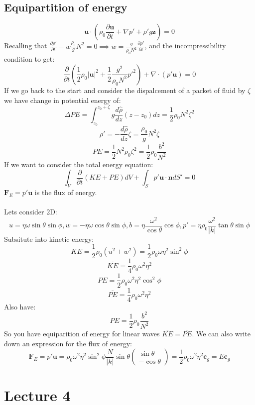 \documentclass{article}
\begin{document}
\subsection{Equipartition of energy}
$$
\bm u \cdot (\rho_0 \frac{\partial \bm u}{\partial t} + \nabla p' + \rho' g \bm z) = 0
$$
Recalling that $\frac{\partial \rho'}{\partial t} - w \frac{\rho_0}{g} N^2 = 0 \implies w = \frac{g}{\rho_0 N^2} \frac{\partial \rho'}{\partial t}$, and the incompressibility condition to get:
$$
\frac{\partial}{\partial t}( \frac{1}{2} \rho_0 |\bm u |^2 + \frac{1}{2} \frac{g^2}{\rho_0 N^2} p'^2 ) + \nabla \cdot (p' \bm u) = 0
$$
If we go back to the start and consider the dispalcement of a packet of fluid by $\zeta$ we have change in potential energy of:
$$
\Delta PE = \int^{z_0 + \zeta}_{z_0} g \frac{d \hat \rho}{d z} (z - z_0) dz = \frac{1}{2} \rho_0 N^2 \zeta^2
$$
$$
\rho' = - \frac{d \hat \rho}{dz} \zeta = \frac{\rho_0}{g} N^2 \zeta 
$$
$$
PE = \frac{1}{2} N^2 \rho_0 \zeta^2 = \frac{1}{2} \rho_0 \frac{b^2}{N^2}
$$
If we want to consider the total energy equation:
$$
\int_V \frac{\partial}{\partial t} (KE + PE) dV + \int_S p' \bm u \cdot \bm n dS' = 0
$$
$\bm F_E = p'\bm u$ is the flux of energy.\\\\
Lets consider 2D:
$$
u = \eta \omega \sin \theta \sin \phi, w = - \eta \omega \cos \theta \sin \phi, b = \eta \frac{\omega^2}{\cos \theta} \cos \phi, p' = \eta \rho_0 \frac{\omega^2}{|k|} \tan \theta \sin \phi
$$
Subsitute into kinetic energy:
$$
KE = \frac{1}{2} \rho_0 (u^2 + w^2) = \frac{1}{2} \rho_0 \omega \eta^2 \sin^2 \phi
$$
$$
\bar{KE} = \frac{1}{4} \rho_0 \omega^2 \eta^2
$$
$$
PE = \frac{1}{2} \rho_0 \omega^2 \eta^2 \cos^2\phi
$$
$$
\bar{PE} = \frac{1}{4} \rho_0 \omega^2 \eta^2
$$
Also have:
$$
PE = \frac{1}{2} \rho_0 \frac{b^2}{N^2}
$$
So you have equiparition of energy for linear waves $\bar{KE} = \bar{PE}$. We can also write down an expression for the flux of energy:
$$
\bm F_E = p' \bm u = \rho_0 \omega^2 \eta^2 \sin^2 \phi  \frac{N}{|k|} \sin \theta \begin{pmatrix} \sin \theta\\ - \cos \theta \end{pmatrix} = \frac{1}{2} \rho_0 \omega^2 \eta^2 \bm c_g = \bar{E} \bm c_g
$$
\section{Lecture 4}
\end{document}

